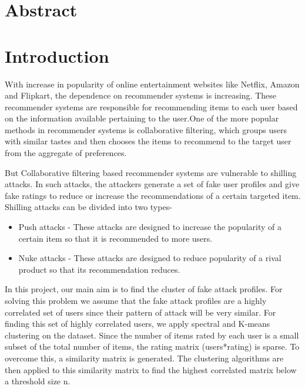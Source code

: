\documentclass[12pt]{article}
\begin{document}
\section*{Abstract}


\clearpage
\tableofcontents
\clearpage
\listoffigures
\listoftables
\clearpage

\section{Introduction}

With increase in popularity of online entertainment websites like Netflix, Amazon and Flipkart, the dependence on recommender systems is increasing.
These recommender systems are responsible for recommending items to each user based on the information available pertaining to the user.One of the more popular methods in recommender systems is collaborative filtering, which groups users with similar tastes and then chooses the items to recommend to the target user from the aggregate of preferences.   
\\
\par
	But Collaborative filtering based recommender systems are vulnerable to shilling attacks. In such attacks, the attackers generate a set of fake user profiles and give fake ratings to reduce or increase the recommendations of a certain targeted item. Shilling attacks can be divided into two types-
	  \begin{itemize}
	  	\item Push attacks - These attacks are designed to increase the popularity of a certain item so that it is recommended to more users.
	  	\item Nuke attacks - These attacks are designed to reduce popularity of a rival product so that its recommendation reduces.
	  	\\
	  \end{itemize}
\par 
    In this project, our main aim is to find the cluster of fake attack profiles. For solving this problem we assume that the fake attack profiles are a highly correlated set of users since their pattern of attack will be very similar. For finding this set of highly correlated users, we apply spectral and K-means clustering on the dataset. Since the number of items rated by each user is a small subset of the total number of items, the rating matrix (users*rating)
    is sparse. To overcome this, a similarity matrix is generated. The clustering algorithms are then applied to this similarity matrix to find the highest correlated matrix below a threshold size n.
 
\end{document}
